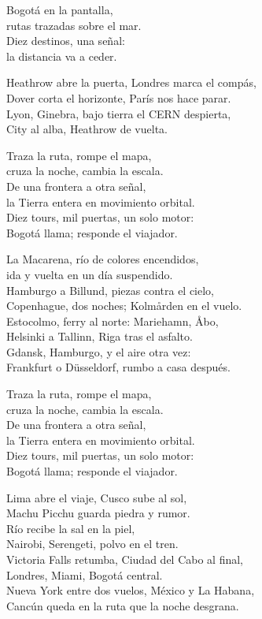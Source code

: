 \begin{lyrics}
Bogotá en la pantalla,\\
rutas trazadas sobre el mar.\\
Diez destinos, una señal:\\
la distancia va a ceder.

Heathrow abre la puerta, Londres marca el compás,\\
Dover corta el horizonte, París nos hace parar.\\
Lyon, Ginebra, bajo tierra el CERN despierta,\\
City al alba, Heathrow de vuelta.

Traza la ruta, rompe el mapa,\\
cruza la noche, cambia la escala.\\
De una frontera a otra señal,\\
la Tierra entera en movimiento orbital.\\
Diez tours, mil puertas, un solo motor:\\
Bogotá llama; responde el viajador.

La Macarena, río de colores encendidos,\\
ida y vuelta en un día suspendido.\\
Hamburgo a Billund, piezas contra el cielo,\\
Copenhague, dos noches; Kolmården en el vuelo.\\
Estocolmo, ferry al norte: Mariehamn, Åbo,\\
Helsinki a Tallinn, Riga tras el asfalto.\\
Gdansk, Hamburgo, y el aire otra vez:\\
Frankfurt o Düsseldorf, rumbo a casa después.

Traza la ruta, rompe el mapa,\\
cruza la noche, cambia la escala.\\
De una frontera a otra señal,\\
la Tierra entera en movimiento orbital.\\
Diez tours, mil puertas, un solo motor:\\
Bogotá llama; responde el viajador.

Lima abre el viaje, Cusco sube al sol,\\
Machu Picchu guarda piedra y rumor.\\
Río recibe la sal en la piel,\\
Nairobi, Serengeti, polvo en el tren.\\
Victoria Falls retumba, Ciudad del Cabo al final,\\
Londres, Miami, Bogotá central.\\
Nueva York entre dos vuelos, México y La Habana,\\
Cancún queda en la ruta que la noche desgrana.


\end{lyrics}
